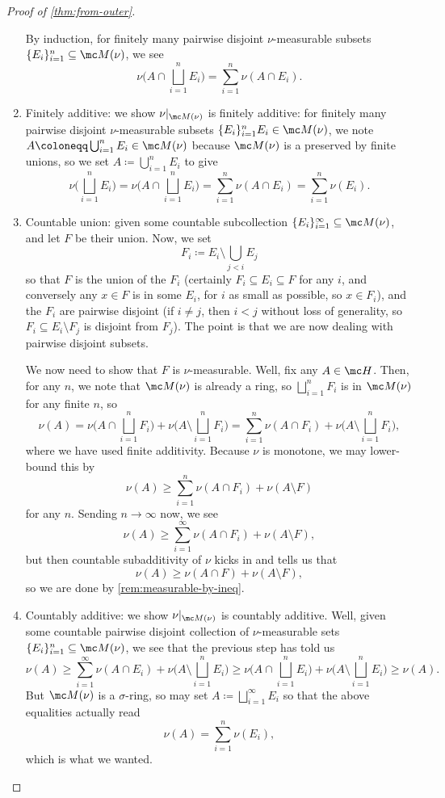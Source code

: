 \documentclass[../notes.tex]{subfiles}
\begin{document}
\begin{proof}[Proof of \autoref{thm:from-outer}]
\begin{enumerate}
		By induction, for finitely many pairwise disjoint $\nu$-measurable subsets $\{E_i\}_{i=1}^n\subseteq\mc M(\nu)$, we see
		\[\nu\Bigg(A\cap\bigsqcup_{i=1}^nE_i\Bigg)=\sum_{i=1}^n\nu(A\cap E_i).\]

		\item Finitely additive: we show $\nu|_{\mc M(\nu)}$ is finitely additive: for finitely many pairwise disjoint $\nu$-measurable subsets $\{E_i\}_{i=1}^nE_i\in\mc M(\nu)$, we note $A\coloneqq\bigcup_{i=1}^nE_i\in\mc M(\nu)$ because $\mc M(\nu)$ is a preserved by finite unions, so we set $A\coloneqq\bigcup_{i=1}^nE_i$ to give
		\[\nu\Bigg(\bigsqcup_{i=1}^nE_i\Bigg)=\nu\Bigg(A\cap\bigsqcup_{i=1}^nE_i\Bigg)=\sum_{i=1}^n\nu(A\cap E_i)=\sum_{i=1}^n\nu(E_i).\]

		\item Countable union: given some countable subcollection $\{E_i\}_{i=1}^\infty\subseteq\mc M(\nu)$, and let $F$ be their union. Now, we set
		\[F_i\coloneqq E_i\setminus\bigcup_{j<i}E_j\]
		so that $F$ is the union of the $F_i$ (certainly $F_i\subseteq E_i\subseteq F$ for any $i$, and conversely any $x\in F$ is in some $E_i$, for $i$ as small as possible, so $x\in F_i$), and the $F_i$ are pairwise disjoint (if $i\ne j$, then $i<j$ without loss of generality, so $F_i\subseteq E_i\setminus F_j$ is disjoint from $F_j$). The point is that we are now dealing with pairwise disjoint subsets.

		We now need to show that $F$ is $\nu$-measurable. Well, fix any $A\in\mc H$. Then, for any $n$, we note that $\mc M(\nu)$ is already a ring, so $\bigsqcup_{i=1}^nF_i$ is in $\mc M(\nu)$ for any finite $n$, so
		\[\nu(A)=\nu\Bigg(A\cap\bigsqcup_{i=1}^nF_i\bigg)+\nu\Bigg(A\setminus\bigsqcup_{i=1}^nF_i\Bigg)=\sum_{i=1}^n\nu(A\cap F_i)+\nu\Bigg(A\setminus\bigsqcup_{i=1}^nF_i\Bigg),\]
		where we have used finite additivity. Because $\nu$ is monotone, we may lower-bound this by
		\[\nu(A)\ge\sum_{i=1}^n\nu(A\cap F_i)+\nu(A\setminus F)\]
		for any $n$. Sending $n\to\infty$ now, we see
		\[\nu(A)\ge\sum_{i=1}^\infty\nu(A\cap F_i)+\nu(A\setminus F),\]
		but then countable subadditivity of $\nu$ kicks in and tells us that
		\[\nu(A)\ge\nu(A\cap F)+\nu(A\setminus F),\]
		so we are done by \autoref{rem:measurable-by-ineq}.

		\item Countably additive: we show $\nu|_{\mc M(\nu)}$ is countably additive. Well, given some countable pairwise disjoint collection of $\nu$-measurable sets $\{E_i\}_{i=1}^n\subseteq\mc M(\nu)$, we see that the previous step has told us
		\[\nu(A)\ge\sum_{i=1}^\infty\nu(A\cap E_i)+\nu\Bigg(A\setminus\bigsqcup_{i=1}^nE_i\Bigg)\ge\nu\Bigg(A\cap\bigsqcup_{i=1}^nE_i\Bigg)+\nu\Bigg(A\setminus\bigsqcup_{i=1}^nE_i\Bigg)\ge\nu(A).\]
		But $\mc M(\nu)$ is a $\sigma$-ring, so may set $A\coloneqq\bigsqcup_{i=1}^\infty E_i$ so that the above equalities actually read
		\[\nu(A)=\sum_{i=1}^n\nu(E_i),\]
		which is what we wanted.
		\qedhere
	\end{enumerate}
\end{proof}
\end{document}
